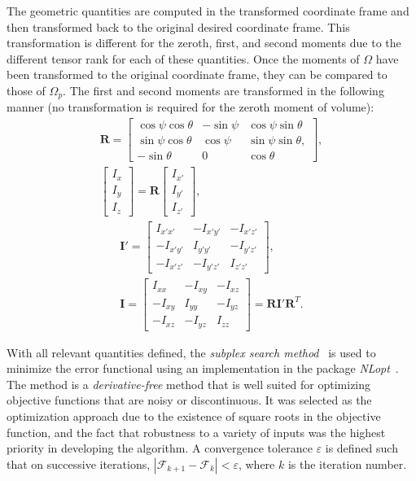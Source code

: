 The geometric quantities are computed in the transformed coordinate frame and then transformed back to the original desired coordinate frame. This transformation is different for the zeroth, first, and second moments due to the different tensor rank for each of these quantities. Once the moments of $\Omega$ have been transformed to the original coordinate frame, they can be compared to those of $\Omega_p$. The first and second moments are transformed in the following manner (no transformation is required for the zeroth moment of volume):
\begin{gather}
\bm{R} = \left[\begin{array} {ccc} {\cos\psi\cos\theta} & {-\sin\psi} & {\cos\psi\sin\theta}\\ {\sin\psi\cos\theta} & {\cos\psi} & {\sin\psi\sin\theta}, \\
{-\sin\theta} & {0} & {\cos\theta}\end{array} \right], \\
\left[\begin{array} {ccc} {I_x} \\ {I_y} \\ {I_z} \end{array} \right] = \bm{R} \left[\begin{array} {ccc} {I_{x'}} \\ {I_{y'}} \\ {I_{z'}} \end{array} \right],
\end{gather}
\begin{gather}
\bm{I}' = \left[\begin{array} {ccc} {I_{x'x'}} & {-I_{x'y'}} & {-I_{x'z'}}\\ {-I_{x'y'}} & {I_{y'y'}} & {-I_{y'z'}} \\ -{I_{x'z'}} & {-I_{y'z'}} & {I_{z'z'}} \end{array} \right], \\
\bm{I} = \left[\begin{array} {ccc} {I_{xx}} & {-I_{xy}} & {-I_{xz}}\\ {-I_{xy}} & {I_{yy}} & {-I_{yz}} \\ -{I_{xz}} & {-I_{yz}} & {I_{zz}} \end{array} \right] = \bm{R}\bm{I}'\mathbf{R}^T.
\end{gather}

With all relevant quantities defined, the \textit{subplex search method}~\cite{rowan} is used to minimize the error functional using an implementation in the package \textit{NLopt}~\cite{nlo}. The method is a \textit{derivative-free} method that is well suited for optimizing objective functions that are noisy or discontinuous. It was selected as the optimization approach due to the existence of square roots in the objective function, and the fact that robustness to a variety of inputs was the highest priority in developing the algorithm. A convergence tolerance $\varepsilon$ is defined such that on successive iterations, $\left| \mathcal{F}_{k+1} - \mathcal{F}_{k}\right| < \varepsilon$, where $k$ is the iteration number.

